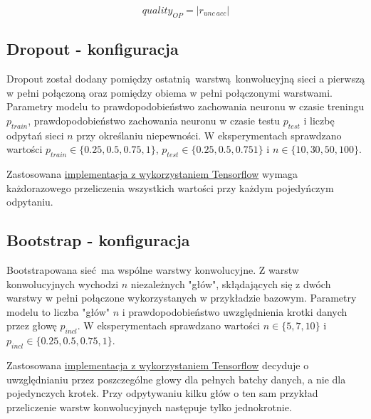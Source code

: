 \[ quality_{OP} = |r_{unc\ acc}|\]

\subsection{Dropout - konfiguracja}
Dropout został dodany pomiędzy ostatnią warstwą konwolucyjną sieci a pierwszą w pełni połączoną oraz pomiędzy obiema w pełni połączonymi warstwami.
Parametry modelu to prawdopodobieństwo zachowania neuronu w czasie treningu $p_{train}$, prawdopodobieństwo zachowania neuronu w czasie testu $p_{test}$ i liczbę odpytań sieci $n$ przy określaniu niepewności. W eksperymentach sprawdzano wartości $p_{train} \in \{0.25, 0.5, 0.75, 1\}$, $p_{test} \in \{0.25, 0.5, 0.751\}$ i $n \in \{10, 30, 50, 100\}$.

Zastosowana \href{https://link.do.pliku}{implementacja z wykorzystaniem Tensorflow} wymaga każdorazowego przeliczenia wszystkich wartości przy każdym pojedyńczym odpytaniu.

\subsection{Bootstrap - konfiguracja}
Bootstrapowana sieć ma wspólne warstwy konwolucyjne. Z warstw konwolucyjnych wychodzi $n$ niezależnych "głów", skłądających się z dwóch warstwy w pełni połączone wykorzystanych w przykładzie bazowym. Parametry modelu to liczba "głów" $n$ i prawdopodobieństwo uwzględnienia krotki danych przez głowę $p_{incl}$.  W eksperymentach sprawdzano wartości $n \in  \{5,7,10\}$ i $p_{incl}\in\{0.25, 0.5, 0.75, 1\}$.

Zastosowana \href{https://link.do.pliku}{implementacja z wykorzystaniem Tensorflow} decyduje o uwzględnianiu przez poszczególne głowy dla pełnych batchy danych, a nie dla pojedynczych krotek. Przy odpytywaniu kilku głów o ten sam przykład przeliczenie warstw konwolucyjnych następuje tylko jednokrotnie.


